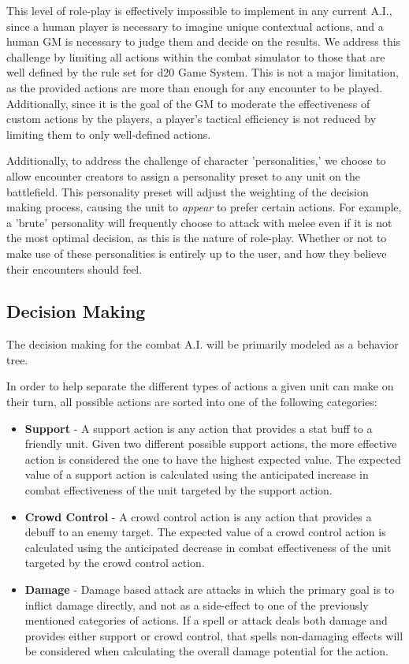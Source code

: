 \documentclass[12pt,a4paper]{report}
\begin{document}
		This level of role-play is effectively impossible to implement in any current A.I., since a human player is necessary to imagine unique contextual actions, and a human GM is necessary to judge them and decide on the results. We address this challenge by limiting all actions within the combat simulator to those that are well defined by the rule set for d20 Game System. This is not a major limitation, as the provided actions are more than enough for any encounter to be played. Additionally, since it is the goal of the GM to moderate the effectiveness of custom actions by the players, a player's tactical efficiency is not reduced by limiting them to only well-defined actions. 
		
		Additionally, to address the challenge of character 'personalities,' we choose to allow encounter creators to assign a personality preset to any unit on the battlefield. This personality preset will adjust the weighting of the decision making process, causing the unit to \textit{appear} to prefer certain actions. For example, a 'brute' personality will frequently choose to attack with melee even if it is not the most optimal decision, as this is the nature of role-play. Whether or not to make use of these personalities is entirely up to the user, and how they believe their encounters should feel. 
		
		
		\subsection{Decision Making}
		
		The decision making for the combat A.I. will be primarily modeled as a behavior tree. 
		
		In order to help separate the different types of actions a given unit can make on their turn, all possible actions are sorted into one of the following categories:
		
		\begin{itemize}
			\item \textbf{Support} - A support action is any action that provides a stat buff to a friendly unit. Given two different possible support actions, the more effective action is considered the one to have the highest expected value. The expected value of a support action is calculated using the anticipated increase in combat effectiveness of the unit targeted by the support action. 
			\item \textbf{Crowd Control} - A crowd control action is any action that provides a debuff to an enemy target. The expected value of a crowd control action is calculated using the anticipated decrease in combat effectiveness of the unit targeted by the crowd control action.
			\item \textbf{Damage} - Damage based attack are attacks in which the primary goal is to inflict damage directly, and not as a side-effect to one of the previously mentioned categories of actions. If a spell or attack deals both damage and provides either support or crowd control, that spells non-damaging effects will be considered when calculating the overall damage potential for the action. 
		\end{itemize}
		
\end{document}
